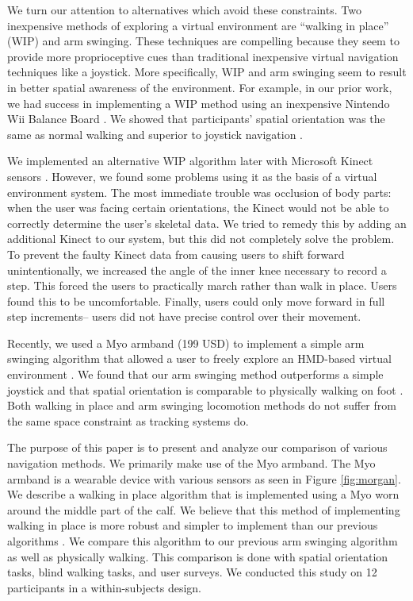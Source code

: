 \documentclass[titlepage]{article}
\theoremstyle{definition}
\theoremstyle{proof}
\begin{document}
We turn our attention to alternatives which avoid these constraints.
Two inexpensive methods of exploring a virtual environment are ``walking in place'' (WIP) and arm swinging.
These techniques are compelling because they seem to provide more proprioceptive cues
than traditional inexpensive virtual navigation techniques like a joystick.
More specifically, WIP and arm swinging seem to result in better spatial awareness of the environment.
For example, in our prior work,
we had success in implementing a WIP method
using an inexpensive Nintendo Wii Balance Board \cite{Williams:2011:EWP}.
We showed that participants' spatial orientation was the same as normal walking and superior to joystick navigation \cite{Williams:2011:EWP}.

We implemented an alternative WIP algorithm later with Microsoft Kinect sensors \cite{Wilson:2014}.
However, we found some problems using it as the basis of a virtual environment system.
The most immediate trouble was occlusion of body parts:
when the user was facing certain orientations,
the Kinect would not be able to correctly determine the user's skeletal data.
We tried to remedy this by adding an additional Kinect to our system,
but this did not completely solve the problem.
To prevent the faulty Kinect data from causing users to shift forward unintentionally,
we increased the angle of the inner knee necessary to record a step.
This forced the users to practically march rather than walk in place.
Users found this to be uncomfortable.
Finally, users could only move forward in full step increments--
users did not have precise control over their movement.

Recently, we used a Myo armband (199 USD)
to implement a simple arm swinging algorithm that allowed a user to freely explore an HMD-based virtual environment \cite{previousMYO}.
We found that our arm swinging method outperforms a simple joystick and that spatial orientation is comparable to physically walking on foot \cite{previousMYO}.
Both walking in place and arm swinging locomotion methods do not suffer from the same space constraint as tracking systems do.


The purpose of this paper is to present and analyze our comparison of various navigation methods.
We primarily make use of the Myo armband.
The Myo armband is a wearable device with various sensors as seen in Figure \ref{fig:morgan}.
We describe a walking in place algorithm that is implemented using a Myo worn around the middle part of the calf.
We believe that this method of implementing walking in place is more robust and simpler to implement than our previous algorithms \cite{Williams:2011:EWP,Wilson:2014}.
We compare this algorithm to our previous arm swinging algorithm as well as physically walking.
This comparison is done with spatial orientation tasks,
blind walking tasks, and user surveys.
We conducted this study on 12 participants in a within-subjects design.
\end{document}
